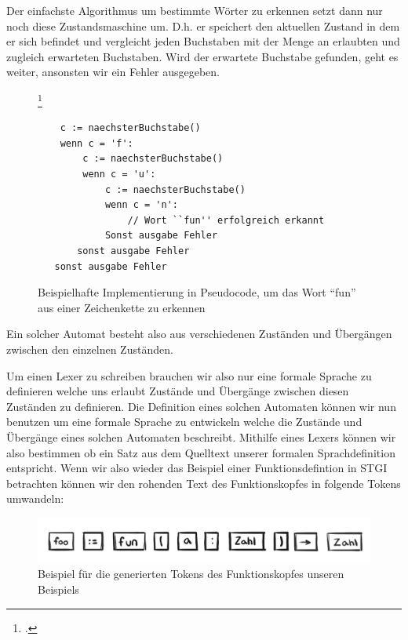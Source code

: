 \documentclass[a4paper, 12pt]{article}
\begin{document}
Der einfachste Algorithmus um bestimmte W\"orter zu erkennen setzt dann
nur noch diese Zustandsmaschine um. D.h. er speichert den aktuellen Zustand
in dem er sich befindet und vergleicht jeden Buchstaben mit der Menge an
erlaubten und zugleich erwarteten Buchstaben. Wird der erwartete Buchstabe
gefunden, geht es weiter, ansonsten wir ein Fehler ausgegeben.

\begin{figure}[h]
  \caption{Beispielhafte Implementierung in Pseudocode, um das Wort
“fun” aus einer Zeichenkette zu erkennen} \footcite[vgl][28]{eac}
  \begin{verbatim}
    c := naechsterBuchstabe()
    wenn c = 'f':
        c := naechsterBuchstabe()
        wenn c = 'u':
            c := naechsterBuchstabe()
            wenn c = 'n':
                // Wort ``fun'' erfolgreich erkannt
            Sonst ausgabe Fehler
       sonst ausgabe Fehler
   sonst ausgabe Fehler
  \end{verbatim}
\end{figure}

Ein solcher Automat besteht also aus verschiedenen Zust\"anden und \"Uberg\"angen zwischen den einzelnen Zust\"anden.

Um einen Lexer zu schreiben brauchen wir also nur eine formale Sprache zu definieren
welche uns erlaubt Zust\"ande und \"Uberg\"ange zwischen diesen Zust\"anden
zu definieren.
Die Definition eines solchen Automaten k\"onnen wir nun benutzen um eine formale Sprache zu entwickeln welche die Zust\"ande und \"Uberg\"ange eines solchen Automaten beschreibt. Mithilfe eines Lexers k\"onnen wir also bestimmen
ob ein Satz aus dem Quelltext unserer formalen Sprachdefinition entspricht.
Wenn wir also wieder das Beispiel einer Funktionsdefintion in STGI betrachten k\"onnen wir den rohenden Text des Funktionskopfes in folgende Tokens
umwandeln:

\begin{figure}[h]
  \caption{Beispiel f\"ur die generierten Tokens des Funktionskopfes unseren
Beispiels}
  \includegraphics[scale=0.32]{tokens}
\end{figure}
\end{document}
